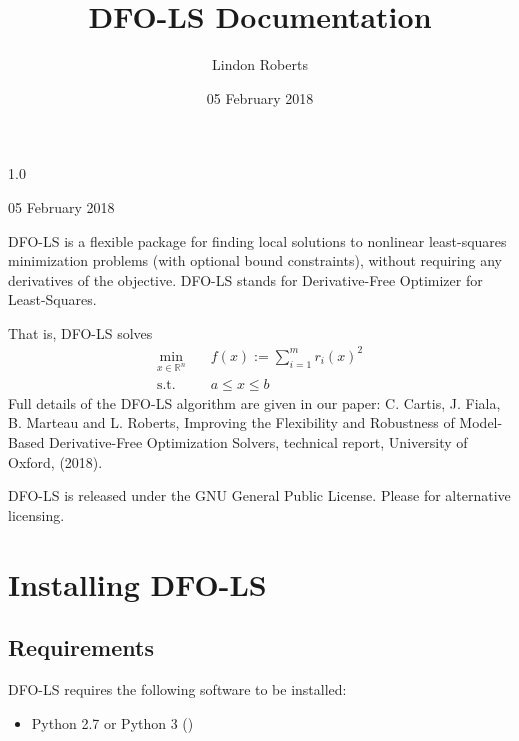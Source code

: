 \documentclass[letterpaper,10pt,english]{sphinxmanual}
\title{DFO-LS Documentation}
\date{05 February 2018}
\author{Lindon Roberts}
\begin{document}
\maketitle
\sphinxtableofcontents
{}\label{\detokenize{index::doc}}


 1.0

 05 February 2018

 

DFO-LS is a flexible package for finding local solutions to nonlinear least-squares minimization problems (with optional bound constraints), without requiring any derivatives of the objective. DFO-LS stands for Derivative-Free Optimizer for Least-Squares.

That is, DFO-LS solves
\begin{equation*}
\begin{split}\min_{x\in\mathbb{R}^n}  &\quad  f(x) := \sum_{i=1}^{m}r_{i}(x)^2 \\
\text{s.t.} &\quad  a \leq x \leq b\end{split}
\end{equation*}
Full details of the DFO-LS algorithm are given in our paper: C. Cartis, J. Fiala, B. Marteau and L. Roberts, Improving the Flexibility and Robustness of Model-Based Derivative-Free Optimization Solvers, technical report, University of Oxford, (2018).

DFO-LS is released under the GNU General Public License. Please  for alternative licensing.


\chapter{Installing DFO-LS}
\label{\detokenize{install::doc}}\label{\detokenize{install:installing-dfo-ls}}\label{\detokenize{install:dfo-ls-derivative-free-optimizer-for-least-squares-minimization}}

\section{Requirements}
\label{\detokenize{install:requirements}}
DFO-LS requires the following software to be installed:
\begin{itemize}
\item {} 
Python 2.7 or Python 3 ()

\end{itemize}
\end{document}
